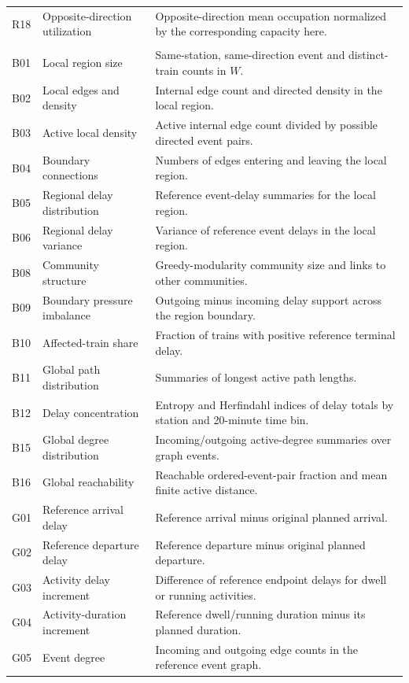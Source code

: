 \begin{longtable}{@{}>{\raggedright\arraybackslash}p{0.8cm}>{\raggedright\arraybackslash}p{3.7cm}>{\raggedright\arraybackslash}p{10.0cm}@{}}
R18 & Opposite-direction utilization & Opposite-direction mean occupation normalized by the corresponding capacity here. \\
\multicolumn{3}{@{}l}{\textbf{Delay propagation patterns}}\\*[2pt]
B01 & Local region size & Same-station, same-direction event and distinct-train counts in $W$. \\
B02 & Local edges and density & Internal edge count and directed density in the local region. \\
B03 & Active local density & Active internal edge count divided by possible directed event pairs. \\
B04 & Boundary connections & Numbers of edges entering and leaving the local region. \\
B05 & Regional delay distribution & Reference event-delay summaries for the local region. \\
B06 & Regional delay variance & Variance of reference event delays in the local region. \\
B08 & Community structure & Greedy-modularity community size and links to other communities. \\
B09 & Boundary pressure imbalance & Outgoing minus incoming delay support across the region boundary. \\
B10 & Affected-train share & Fraction of trains with positive reference terminal delay. \\
B11 & Global path distribution & Summaries of longest active path lengths. \\
B12 & Delay concentration & Entropy and Herfindahl indices of delay totals by station and 20-minute time bin. \\
B15 & Global degree distribution & Incoming/outgoing active-degree summaries over graph events. \\
B16 & Global reachability & Reachable ordered-event-pair fraction and mean finite active distance. \\
G01 & Reference arrival delay & Reference arrival minus original planned arrival. \\
G02 & Reference departure delay & Reference departure minus original planned departure. \\
G03 & Activity delay increment & Difference of reference endpoint delays for dwell or running activities. \\
G04 & Activity-duration increment & Reference dwell/running duration minus its planned duration. \\
G05 & Event degree & Incoming and outgoing edge counts in the reference event graph. \\

\end{longtable}

